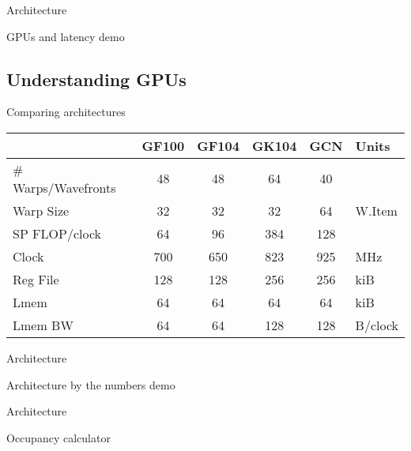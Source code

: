 \documentclass[english,compress]{beamer}
\begin{document}

\begin{frame}{Architecture}
  \begin{center}
  \Huge GPUs and latency demo
  \end{center}
\end{frame}
\subsection{Understanding GPUs}
\begin{frame}{Comparing architectures}
  \begin{tabular}{l|cccc|l}
    & GF100 & GF104 & GK104 & GCN & Units\\
    \hline
    \# Warps/Wavefronts & 48 & 48 & 64 & 40 \\
    Warp Size & 32 & 32 & 32 & 64 & W.Item \\
    \hline
    SP FLOP/clock & 64 & 96 & 384 & 128 \\
    Clock & 700 & 650 & 823 & 925 & MHz \\
    \hline
    Reg File & 128 & 128 & 256 & 256 & kiB \\
    Lmem & 64  & 64 & 64 & 64 & kiB \\
    Lmem BW & 64  & 64 & 128 & 128 & B/clock \\
    \hline
  \end{tabular}
\end{frame}
\begin{frame}{Architecture}
  \begin{center}
  \Huge Architecture by the numbers demo
  \end{center}
\end{frame}
\begin{frame}{Architecture}
  \begin{center}
  \Huge Occupancy calculator
  \end{center}
\end{frame}
\end{document}
